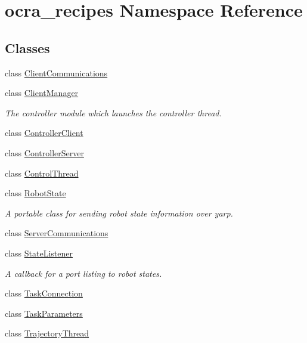 \hypertarget{namespaceocra__recipes}{}\section{ocra\+\_\+recipes Namespace Reference}
\label{namespaceocra__recipes}
\subsection*{Classes}
\begin{DoxyCompactItemize}
\item 
class \hyperlink{classocra__recipes_1_1ClientCommunications}{Client\+Communications}
\item 
class \hyperlink{classocra__recipes_1_1ClientManager}{Client\+Manager}
\begin{DoxyCompactList}\small\item\em The controller module which launches the controller thread. \end{DoxyCompactList}\item 
class \hyperlink{classocra__recipes_1_1ControllerClient}{Controller\+Client}
\item 
class \hyperlink{classocra__recipes_1_1ControllerServer}{Controller\+Server}
\item 
class \hyperlink{classocra__recipes_1_1ControlThread}{Control\+Thread}
\item 
class \hyperlink{classocra__recipes_1_1RobotState}{Robot\+State}
\begin{DoxyCompactList}\small\item\em A portable class for sending robot state information over yarp. \end{DoxyCompactList}\item 
class \hyperlink{classocra__recipes_1_1ServerCommunications}{Server\+Communications}
\item 
class \hyperlink{classocra__recipes_1_1StateListener}{State\+Listener}
\begin{DoxyCompactList}\small\item\em A callback for a port listing to robot states. \end{DoxyCompactList}\item 
class \hyperlink{classocra__recipes_1_1TaskConnection}{Task\+Connection}
\item 
class \hyperlink{classocra__recipes_1_1TaskParameters}{Task\+Parameters}
\item 
class \hyperlink{classocra__recipes_1_1TrajectoryThread}{Trajectory\+Thread}
\end{DoxyCompactItemize}
